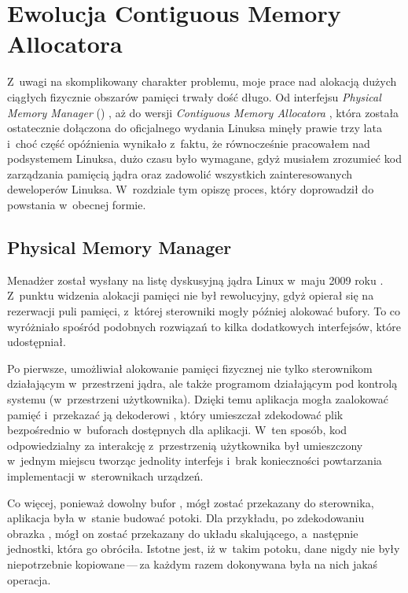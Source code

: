 \chapter{Ewolucja Contiguous Memory Allocatora}

Z~uwagi na skomplikowany charakter problemu, moje prace nad alokacją
dużych ciągłych fizycznie obszarów pamięci trwały dość długo.  Od
interfejsu \textit{Physical Memory Manager} ()
\autocite{patch:pmm}, aż do wersji \textit{Contiguous Memory
  Allocatora} , która została ostatecznie dołączona do oficjalnego
wydania Linuksa \autocite{patch:cma-24} minęły prawie trzy lata i~choć
część opóźnienia wynikało z~faktu, że równocześnie pracowałem nad
podsystemem  Linuksa, dużo czasu było wymagane, gdyż musiałem
zrozumieć kod zarządzania pamięcią jądra oraz zadowolić wszystkich
zainteresowanych deweloperów Linuksa.  W~rozdziale tym opiszę proces,
który doprowadził do powstania  w~obecnej formie.


\section{Physical Memory Manager}\label{sec:evo-pmm}

Menadżer  został wysłany na listę dyskusyjną jądra Linux
w~maju 2009 roku \autocite{patch:pmm}.  Z~punktu widzenia alokacji
pamięci nie był rewolucyjny, gdyż opierał się na rezerwacji puli
pamięci, z~której sterowniki mogły później alokować bufory.  To co
wyróżniało  spośród podobnych rozwiązań to kilka dodatkowych
interfejsów, które udostępniał.

Po pierwsze, umożliwiał alokowanie pamięci fizycznej nie tylko
sterownikom działającym w~przestrzeni jądra, ale także programom
działającym pod kontrolą systemu (w~przestrzeni użytkownika).  Dzięki
temu aplikacja mogła zaalokować pamięć i~przekazać ją dekoderowi ,
który umieszczał zdekodować plik bezpośrednio w~buforach dostępnych
dla aplikacji. W~ten sposób, kod odpowiedzialny za interakcję
z~przestrzenią użytkownika był umieszczony w~jednym miejscu tworząc
jednolity interfejs i~brak konieczności powtarzania implementacji
w~sterownikach urządzeń.

Co więcej, ponieważ dowolny bufor , mógł zostać przekazany do
sterownika, aplikacja była w~stanie budować potoki.  Dla przykładu, po
zdekodowaniu obrazka , mógł on zostać przekazany do układu
skalującego, a~następnie jednostki, która go obróciła.  Istotne jest,
iż w~takim potoku, dane nigdy nie były niepotrzebnie kopiowane\,---\,za
każdym razem dokonywana była na nich jakaś operacja.

